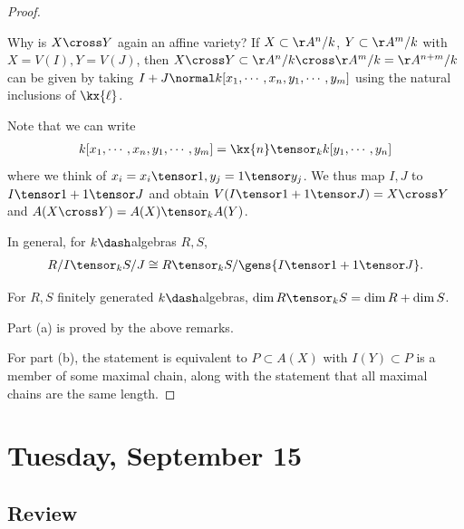 \begin{proof}

\begin{remark}

Why is \(X\cross Y\) again an affine variety? If \(X\subset \AA^n/k\),
\(Y\subset \AA^m/k\) with \(X = V(I), Y = V(J)\), then
\(X\cross Y \subset \AA^n/k \cross \AA^m/k = \AA^{n+m}/k\) can be given
by taking \(I+J \normal k[x_1, \cdots, x_n, y_1, \cdots, y_m]\) using
the natural inclusions of \(\kx{\ell}\).

Note that we can write
\begin{align*}  
k[x_1, \cdots, x_n, y_1, \cdots, y_m] = \kx{n} \tensor_k k[y_1, \cdots, y_n]
\end{align*} where we think of
\(x_i = x_i \tensor 1, y_j = 1 \tensor y_j\). We thus map \(I, J\) to
\(I\tensor 1 + 1\tensor J\) and obtain
\(V(I\tensor 1 + 1\tensor J) = X\cross Y\) and
\(A(X\cross Y) = A(X)\tensor_k A(Y)\).

In general, for \(k\dash\)algebras \(R,S\),
\begin{align*}  
R/I \tensor_k S/J \cong R\tensor_k S / \gens{I\tensor 1 + 1\tensor J}
.\end{align*}

\end{remark}

\begin{remark}

For \(R,S\) finitely generated \(k\dash\)algebras,
\(\dim R\tensor_k S = \dim R + \dim S\).

\end{remark}

Part (a) is proved by the above remarks.

For part (b), the statement is equivalent to \(P\subset A(X)\) with
\(I(Y) \subset P\) is a member of some maximal chain, along with the
statement that all maximal chains are the same length.

\end{proof}

\hypertarget{tuesday-september-15}{%
\section{Tuesday, September 15}\label{tuesday-september-15}}

\hypertarget{review}{%
\subsection{Review}\label{review}}

